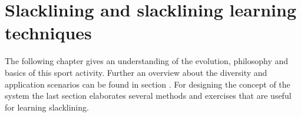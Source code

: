 \chapter{Slacklining  and slacklining learning techniques}\label{3_slacklining}
The following chapter \textit{} gives an understanding of the evolution, philosophy and basics of this sport activity. Further an overview about the diversity and application scenarios can be found in section \textit{}. For designing the concept of the system the last section \textit{} elaborates several methods and exercises that are useful for learning slacklining.
 

 
 
 